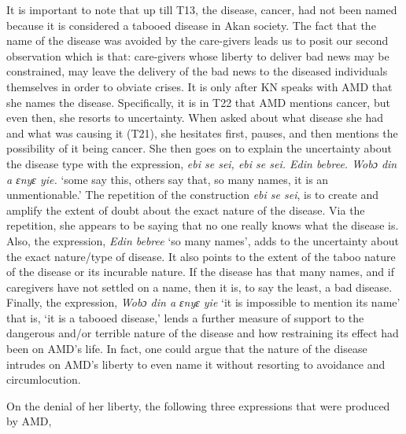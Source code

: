\documentclass[output=paper,colorlinks,citecolor=brown]{langscibook}
\begin{document}
It is important to note that up till T13, the disease, cancer, had not been named because it is considered a tabooed disease in Akan society. The fact that the name of the disease was avoided by the care-givers leads us to posit our second observation which is that: care-givers whose liberty to deliver bad news may be constrained, may leave the delivery of the bad news to the diseased individuals themselves in order to obviate crises. It is only after KN speaks with AMD that she names the disease. Specifically, it is in T22 that AMD mentions cancer, but even then, she resorts to uncertainty. When asked about what disease she had and what was causing it (T21), she hesitates first, pauses, and then mentions the possibility of it being cancer. She then goes on to explain the uncertainty about the disease type with the expression, \textit{ebi se sei, ebi se sei. Edin bebree. Wobɔ din a ɛnyɛ yie.} ‘some say this, others say that, so many names, it is an unmentionable.’ The repetition of the construction \textit{ebi se sei}, is to create and amplify the extent of doubt about the exact nature of the disease. Via the repetition, she appears to be saying that no one really knows what the disease is. Also, the expression, \textit{Edin bebree} ‘so many names’, adds to the uncertainty about the exact nature/type of disease. It also points to the extent of the taboo nature of the disease or its incurable nature. If the disease has that many names, and if caregivers have not settled on a name, then it is, to say the least, a bad disease. Finally, the expression, \textit{Wobɔ din a ɛnyɛ yie} ‘it is impossible to mention its name’ that is, ‘it is a tabooed disease,’ lends a further measure of support to the dangerous and/or terrible nature of the disease and how restraining its effect had been on AMD’s life. In fact, one could argue that the nature of the disease intrudes on AMD’s liberty to even name it without resorting to avoidance and circumlocution.

On the denial of her liberty, the following three expressions that were produced by AMD,
\end{document}
